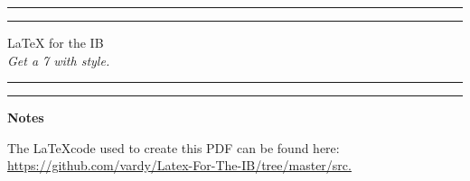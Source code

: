 \documentclass[12pt,a4paper]{article}
\begin{document}

\begin{titlepage}
\centering %
\scshape %
\vfill

\rule{\textwidth}{1.6pt}\vspace*{-\baselineskip}\vspace*{2pt}
\rule{\textwidth}{0.4pt}

\vspace{1.5\baselineskip} %
\LARGE{\LaTeX{} for the IB}\\
\vspace{0.2\baselineskip}
\small{\textit{Get a 7 with style.}}
\vspace{0.75\baselineskip} %

\rule{\textwidth}{0.4pt}\vspace*{-\baselineskip}\vspace{3.2pt}
\rule{\textwidth}{1.6pt}

\vfill
\end{titlepage}



\begin{center}
\tableofcontents
\vspace{1in}

\Large{\textbf{Notes}}
\end{center}

The \LaTeX code used to create this PDF can be found here: \url{https://github.com/vardy/Latex-For-The-IB/tree/master/src.}


\newpage




\newpage


\newpage


\newpage


\newpage

\end{document}
